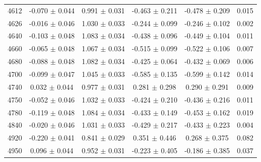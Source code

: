 \begin{table}[h]
{\begin{tabular}{cccccc}
        4612 & -0.070 $\pm$ 0.044 & 0.991 $\pm$ 0.031 & -0.463 $\pm$ 0.211 & -0.478 $\pm$ 0.209 & 0.015\\
        4626 & -0.016 $\pm$ 0.046 & 1.030 $\pm$ 0.033 & -0.244 $\pm$ 0.099 & -0.246 $\pm$ 0.102 & 0.002\\
        4640 & -0.103 $\pm$ 0.048 & 1.083 $\pm$ 0.034 & -0.438 $\pm$ 0.096 & -0.449 $\pm$ 0.104 & 0.011\\
        4660 & -0.065 $\pm$ 0.048 & 1.067 $\pm$ 0.034 & -0.515 $\pm$ 0.099 & -0.522 $\pm$ 0.106 & 0.007\\
        4680 & -0.088 $\pm$ 0.048 & 1.082 $\pm$ 0.034 & -0.425 $\pm$ 0.064 & -0.432 $\pm$ 0.069 & 0.006\\
        4700 & -0.099 $\pm$ 0.047 & 1.045 $\pm$ 0.033 & -0.585 $\pm$ 0.135 & -0.599 $\pm$ 0.142 & 0.014\\
        4740 & 0.032 $\pm$ 0.044 & 0.977 $\pm$ 0.031 & 0.281 $\pm$ 0.298 & 0.290 $\pm$ 0.291 & 0.009\\
        4750 & -0.052 $\pm$ 0.046 & 1.032 $\pm$ 0.033 & -0.424 $\pm$ 0.210 & -0.436 $\pm$ 0.216 & 0.011\\
        4780 & -0.119 $\pm$ 0.048 & 1.084 $\pm$ 0.034 & -0.433 $\pm$ 0.149 & -0.453 $\pm$ 0.162 & 0.019\\
        4840 & -0.020 $\pm$ 0.046 & 1.031 $\pm$ 0.033 & -0.429 $\pm$ 0.217 & -0.433 $\pm$ 0.223 & 0.004\\
        4920 & -0.220 $\pm$ 0.041 & 0.841 $\pm$ 0.029 & 0.351 $\pm$ 0.446 & 0.268 $\pm$ 0.375 & 0.082\\
        4950 & 0.096 $\pm$ 0.044 & 0.952 $\pm$ 0.031 & -0.223 $\pm$ 0.405 & -0.186 $\pm$ 0.385 & 0.037\\
        \hline\hline
        \end{tabular}
        }
\end{table}

